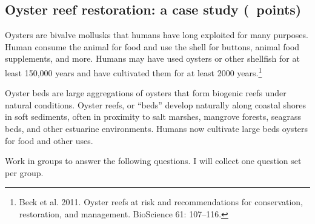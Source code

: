 \documentclass[12pt, addpoints, hidelinks]{exam}
\begin{document}
\subsection*{Oyster reef restoration: a case study (\numpoints\ points)}

Oysters are bivalve mollusks that humans have long exploited for many purposes. Human consume the animal for food and use the shell for buttons, animal food supplements, and more. Humans may have used oysters or other shellfish for at least 150,000 years and have cultivated them for at least 2000 years.\footnote{Beck et al. 2011. Oyster reefs at risk and recommendations for conservation, restoration, and management. BioScience 61: 107--116.}

Oyster beds are large aggregations of oysters that form biogenic reefs under natural conditions. Oyster reefs, or “beds” develop naturally along coastal shores in soft sediments, often in proximity to salt marshes, mangrove forests, seagrass beds, and other estuarine environments. Humans now cultivate large beds oysters for food and other uses. 

Work in groups to answer the following questions. I will collect one question set per group.
\end{document}
